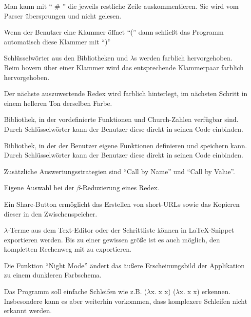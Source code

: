 \documentclass[parskip=full,11pt,twoside]{scrartcl}
\begin{document}
Man kann mit \enquote{ \# } die jeweils restliche Zeile auskommentieren. Sie wird vom Parser übersprungen und nicht gelesen.

Wenn der Benutzer eine Klammer öffnet \enquote{(} dann schließt das Programm automatisch diese Klammer mit \enquote{)}

Schlüsselwörter aus den Bibliotheken und $\lambda$s werden farblich hervorgehoben. Beim hovern über einer Klammer wird das entsprechende Klammerpaar farblich hervorgehoben.

Der nächste auszuwertende Redex wird farblich hinterlegt, im nächsten Schritt in einem helleren Ton derselben Farbe.

Bibliothek, in der vordefinierte Funktionen und Church-Zahlen verfügbar sind. Durch Schlüsselwörter kann der Benutzer diese direkt in seinen Code einbinden.

Bibliothek, in der der Benutzer eigene Funktionen definieren und speichern kann. Durch Schlüsselwörter kann der Benutzer diese direkt in seinen Code einbinden.

Zusätzliche Auswertungsstrategien sind \enquote{Call by Name} und \enquote{Call by Value}.

Eigene Auswahl bei der $\beta$-Reduzierung eines Redex.

Ein Share-Button ermöglicht das Erstellen von short-URLs sowie das Kopieren dieser in den Zwischenspeicher.

$\lambda$-Terme aus dem Text-Editor oder der Schrittliste können in \LaTeX-Snippet exportieren werden. Bis zu einer gewissen größe ist es auch möglich, den kompletten Rechenweg mit zu exportieren.

Die Funktion \enquote{Night Mode} ändert das äußere Erscheinungsbild der Applikation zu einem dunkleren Farbschema.

Das Programm soll einfache Schleifen wie z.B. ($\lambda$x. x x) ($\lambda$x. x x) erkennen. Insbesondere kann es aber weiterhin vorkommen, dass komplexere Schleifen nicht erkannt werden.
\end{document}
